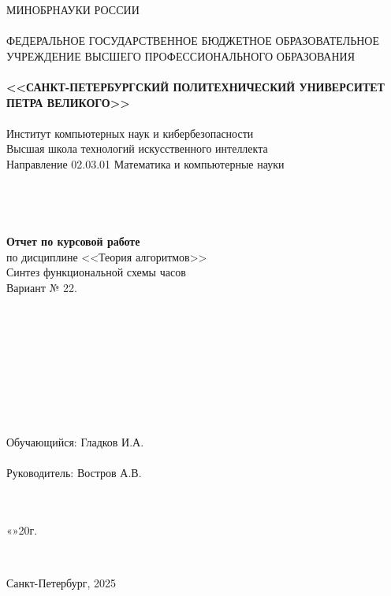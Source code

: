 \documentclass[10pt,a4paper,final]{article} %
\begin{document}
\thispagestyle{empty}

\begin{center}
	{\Large МИНОБРНАУКИ РОССИИ}\\
	~\\
	{\large ФЕДЕРАЛЬНОЕ ГОСУДАРСТВЕННОЕ БЮДЖЕТНОЕ ОБРАЗОВАТЕЛЬНОЕ УЧРЕЖДЕНИЕ ВЫСШЕГО ПРОФЕССИОНАЛЬНОГО ОБРАЗОВАНИЯ}\\
	~\\
	{\Large \bf <<САНКТ-ПЕТЕРБУРГСКИЙ ПОЛИТЕХНИЧЕСКИЙ УНИВЕРСИТЕТ ПЕТРА ВЕЛИКОГО>>}\\
	~\\
	{\large Институт компьютерных наук и кибербезопасности}\\
	{\large Высшая школа технологий искусственного интеллекта}\\
	{\large Направление 02.03.01 Математика и компьютерные науки}\\
	~\\
	~\\
	~\\
	~\\
	{\Large \bf Отчет по курсовой работе}\\
	{\Large по дисциплине <<Теория алгоритмов>> }\\

	{\Large Синтез функциональной схемы часов}\\
		{\large  Вариант № 22.}\\ 	
	
	~\\
	~\\
	~\\
	~\\
	~\\
	~\\
	~\\
	~\\
	~\\
	{\large Обучающийся: \underline{\hspace{3.5cm}} \qquad\qquad Гладков И.А.}\\
	~\\
	{\large Руководитель: \underline{\hspace{3.5cm}} \hspace{16mm} Востров А.В.}\\
	~\\
	~\\
\end{center}
\begin{flushright}
	
	«\underline{\hspace{1cm}}»\underline{\hspace{3cm}}20\underline{\hspace{0.7cm}}г.
\end{flushright}
~\\
\begin{center}
	{\large Санкт-Петербург, 2025}
\end{center}
\newpage
\end{document}
